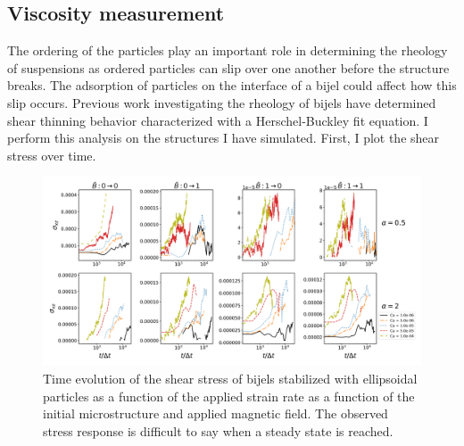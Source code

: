 \subsection{Viscosity measurement}

The ordering of the particles play an important role in determining the rheology of suspensions as ordered particles can slip over one another
before the structure breaks. The adsorption of particles on the interface of a bijel could affect how this slip occurs. Previous work investigating
the rheology of bijels have determined shear thinning behavior characterized with a Herschel-Buckley fit equation. \cite{macmillan_rheological_2019} 
I perform this analysis on the structures I have simulated. First, I plot the shear stress over time.

\begin{figure} 
    \centering 
    \includegraphics[scale=0.3]{../figures/results/paper3/stress-time_compare.png} 
    \caption{Time evolution of the shear stress of bijels stabilized with ellipsoidal particles as a function of the applied strain rate as
             a function of the initial microstructure and applied magnetic field. The observed stress response is difficult to say when a steady
             state is reached.} 
    \label{fig:stress_time} 
\end{figure}

